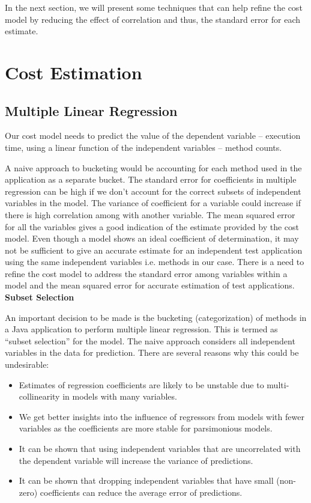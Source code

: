 \documentclass[11pt]{article}
\begin{document}
In the next section, we will present some techniques that can help refine the cost model by reducing the effect of correlation and thus, the standard error for each estimate.
\newpage

\section{Cost Estimation}
\subsection{Multiple Linear Regression}
Our cost model needs to predict the value of the dependent variable -- execution time, using a linear function of the independent variables -- method counts.

A naive approach to bucketing would be accounting for each method used in the application as a separate bucket. The standard error for coefficients in multiple regression can be high if we don't account for the correct subsets of independent variables in the model. The variance of coefficient for a variable could increase if there is high correlation among with another variable. The mean squared error for all the variables gives a good indication of the estimate provided by the cost model. Even though a model shows an ideal coefficient of determination, it may not be sufficient to give an accurate estimate for an independent test application using the same independent variables i.e. methods in our case. There is a need to refine the cost model to address the standard error among variables within a model and the mean squared error for accurate estimation of test applications.\newline
\\\textbf{Subset Selection}

An important decision to be made is the bucketing (categorization) of methods in a Java application to perform multiple linear regression. This is termed as ``subset selection'' for the model. The naive approach considers all independent variables in the data for prediction. There are several reasons why this could be undesirable:
\begin{itemize}
\item Estimates of regression coefficients are likely to be unstable due to multi-collinearity in models with many variables. 
\item We get better insights into the influence of regressors from models with fewer variables as the coefficients are more stable for parsimonious models.
\item It can be shown that using independent variables that are uncorrelated with the dependent variable will increase the variance of predictions.
\item It can be shown that dropping independent variables that have small (non-zero) coefficients can reduce the average error of predictions.
\end{itemize}
\end{document}
